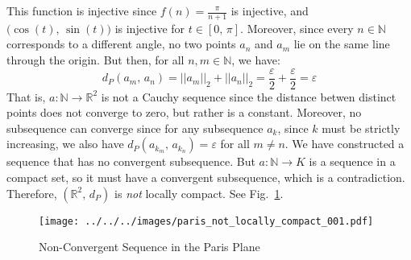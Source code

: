 \documentclass{article}
\theoremstyle{normal}
\begin{document}
    This function is injective since $f(n)=\frac{\pi}{n+1}$ is injective, and
    $\big(\cos(t),\,\sin(t)\big)$ is injective for $t\in[0,\,\pi]$. Moreover,
    since every $n\in\mathbb{N}$ corresponds to a different angle, no
    two points $a_{n}$ and $a_{m}$ lie on the same line through the origin.
    But then, for all $n,m\in\mathbb{N}$, we have:
    \begin{equation}
        d_{P}(a_{m},\,a_{n})
        =||a_{m}||_{2}+||a_{n}||_{2}
        =\frac{\varepsilon}{2}+\frac{\varepsilon}{2}
        =\varepsilon
    \end{equation}
    That is, $a:\mathbb{N}\rightarrow\mathbb{R}^{2}$ is not a Cauchy sequence
    since the distance betwen distinct points does not converge to zero, but
    rather is a constant. Moreover, no subsequence can converge since for
    any subsequence $a_{k}$, since $k$ must be strictly increasing, we also
    have $d_{P}(a_{k_{m}},\,a_{k_{n}})=\varepsilon$ for all $m\ne{n}$.
    We have constructed a sequence that has no convergent subsequence.
    But $a:\mathbb{N}\rightarrow{K}$ is a sequence in a compact set, so it must
    have a convergent subsequence, which is a contradiction. Therefore,
    $(\mathbb{R}^{2},\,d_{P})$ is \textit{not} locally compact.
    See Fig.~\ref{fig:paris_not_locally_compact_001}.
    \begin{figure}
        \centering
        \texttt{[image: ../../../images/paris\_not\_locally\_compact\_001.pdf]}
        \caption{Non-Convergent Sequence in the Paris Plane}
        \label{fig:paris_not_locally_compact_001}
    \end{figure}
\end{document}
